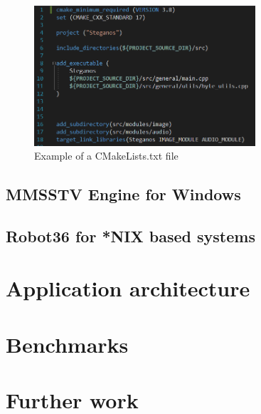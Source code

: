 \begin{multicols*}{2}
\begin{figure}[H]
    \centering
    \includegraphics[height=5.2cm,keepaspectratio]{pics/cmake_file_example}
    \caption{Example of a CMakeLists.txt file}
\end{figure}

\subsection{MMSSTV Engine for Windows}
\subsection{Robot36 for *NIX based systems}

\section{Application architecture}

\section{Benchmarks}

\section{Further work}
\end{multicols*}